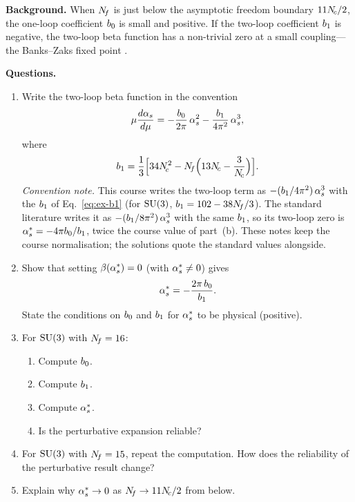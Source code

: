 \documentclass[11pt,a4paper]{article}
\begin{document}
\noindent\textbf{Background.}
When $N_{\!f}$ is just below the asymptotic freedom boundary $11N_{\!c}/2$, the
one-loop coefficient $b_0$ is small and positive.  If the two-loop
coefficient $b_1$ is negative, the two-loop beta function has a non-trivial
zero at a small coupling---the Banks--Zaks fixed point \cite{BanksZaks1982}.

\medskip
\noindent\textbf{Questions.}
\begin{enumerate}[label=(\alph*)]
  \item Write the two-loop beta function in the convention
    \begin{equation}
      \mu\frac{d\alpha_s}{d\mu}
      = -\frac{b_0}{2\pi}\,\alpha_s^2
        - \frac{b_1}{4\pi^2}\,\alpha_s^3,
      \label{eq:ex-beta-2loop}
    \end{equation}
    where
    \begin{equation}
      b_1 = \frac{1}{3}\Bigl[34N_{\!c}^2
        - N_{\!f}\Bigl(13N_{\!c} - \frac{3}{N_{\!c}}\Bigr)\Bigr].
      \label{eq:ex-b1}
    \end{equation}
    \textit{Convention note.}  This course writes the two-loop term as
    $-(b_1/4\pi^2)\,\alpha_s^3$ with the $b_1$ of
    Eq.~\eqref{eq:ex-b1} (for $\mathrm{SU}(3)$, $b_1 = 102 - 38N_{\!f}/3$).  The
    standard literature \cite{Caswell1974,BanksZaks1982,RyttovShrock2011}
    writes it as $-(b_1/8\pi^2)\,\alpha_s^3$ with the same $b_1$, so
    its two-loop zero is $\alpha_s^* = -4\pi b_0/b_1$, twice the course
    value of part~(b).  These notes keep the course normalisation; the
    solutions quote the standard values alongside.

  \item Show that setting $\beta(\alpha_s^*) = 0$ (with $\alpha_s^* \neq 0$)
    gives
    \begin{equation}
      \alpha_s^* = -\frac{2\pi\,b_0}{b_1}.
      \label{eq:ex-bz-fixedpoint}
    \end{equation}
    State the conditions on $b_0$ and $b_1$ for $\alpha_s^*$ to be
    physical (positive).

  \item For $\mathrm{SU}(3)$ with $N_{\!f} = 16$:
    \begin{enumerate}[label=(\roman*)]
      \item Compute $b_0$.
      \item Compute $b_1$.
      \item Compute $\alpha_s^*$.
      \item Is the perturbative expansion reliable?
    \end{enumerate}

  \item For $\mathrm{SU}(3)$ with $N_{\!f} = 15$, repeat the computation. How does
    the reliability of the perturbative result change?

  \item Explain why $\alpha_s^* \to 0$ as $N_{\!f} \to 11N_{\!c}/2$ from below.
\end{enumerate}
\end{document}
